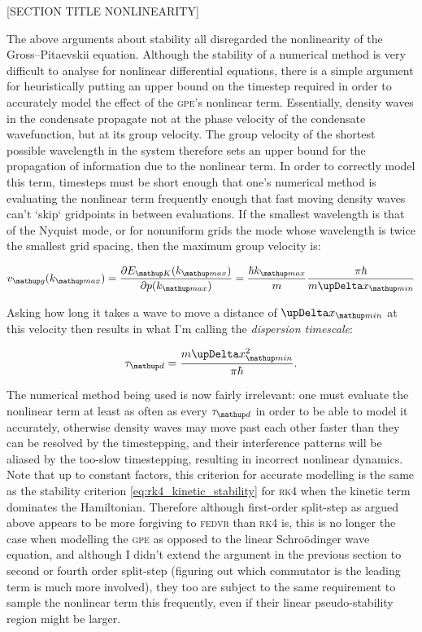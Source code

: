 [SECTION TITLE NONLINEARITY]

The above arguments about stability all disregarded the nonlinearity of the Gross--Pitaevskii equation. Although the stability of a numerical method is very difficult to analyse for nonlinear differential equations, there is a simple argument for heuristically putting an upper bound on the timestep required in order to accurately model the effect of the \textsc{gpe}'s nonlinear term. Essentially, density waves in the condensate propagate not at the phase velocity of the condensate wavefunction, but at its group velocity. The group velocity of the shortest possible wavelength in the system therefore sets an upper bound for the propagation of information due to the nonlinear term. In order to correctly model this term, timesteps must be short enough that one's numerical method is evaluating the nonlinear term frequently enough that fast moving density waves can't `skip` gridpoints in between evaluations. If the smallest wavelength is that of the Nyquist mode, or for nonuniform grids the mode whose wavelength is twice the smallest grid spacing, then the maximum group velocity is:

\begin{equation}
v_\up{g}(k_\up{max}) = \pdv{E_\up{K}(k_\up{max})}{p(k_\up{max})} =  \frac{\hbar k_\up{max}}{m}\frac{\pi \hbar}{m \upDelta x_\up{min}}
\end{equation}

Asking how long it takes a wave to move a distance of $\upDelta x_\up{min}$ at this velocity then results in what I'm calling the \emph{dispersion timescale}:

\begin{equation}
\tau_\up d = \frac{m\upDelta x_\up{min}^2 }{\pi \hbar}.
\end{equation} 

The numerical method being used is now fairly irrelevant: one must evaluate the nonlinear term at least as often as every $\tau_\up d$ in order to be able to model it accurately, otherwise density waves may move past each other faster than they can be resolved by the timestepping, and their interference patterns will be aliased by the too-slow timestepping, resulting in incorrect nonlinear dynamics. Note that up to constant factors, this criterion for accurate modelling is the same as the stability criterion \eqref{eq:rk4_kinetic_stability} for \textsc{rk4} when the kinetic term dominates the Hamiltonian. Therefore although first-order split-step as argued above appears to be more forgiving to \textsc{fedvr} than \textsc{rk4} is, this is no longer the case when modelling the \textsc{gpe} as opposed to the linear Schro\"odinger wave equation, and although I didn't extend the argument in the previous section to second or fourth order split-step (figuring out which commutator is the leading term is much more involved), they too are subject to the same requirement to sample the nonlinear term this frequently, even if their linear pseudo-stability region might be larger.


